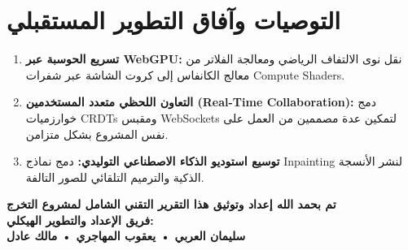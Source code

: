 \documentclass[12pt,a4paper]{report}
\begin{document}
\section{التوصيات وآفاق التطوير المستقبلي}
\begin{enumerate}
    \item \textbf{تسريع الحوسبة عبر WebGPU:} نقل نوى الالتفاف الرياضي ومعالجة الفلاتر من معالج الكانفاس إلى كروت الشاشة عبر شفرات Compute Shaders.
    \item \textbf{التعاون اللحظي متعدد المستخدمين (Real-Time Collaboration):} دمج خوارزميات CRDTs ومقبس WebSockets لتمكين عدة مصممين من العمل على نفس المشروع بشكل متزامن.
    \item \textbf{توسيع استوديو الذكاء الاصطناعي التوليدي:} دمج نماذج Inpainting لنشر الأنسجة الذكية والترميم التلقائي للصور التالفة.
\end{enumerate}

\vspace{1.5cm}
\begin{center}
    \begin{tcolorbox}[colback=StudioLight,colframe=StudioPrimary,arc=3mm,width=0.9\textwidth,center]
        \centering \bfseries \large
        تم بحمد الله إعداد وتوثيق هذا التقرير التقني الشامل لمشروع التخرج\\[0.3cm]
        \textcolor{StudioPrimary}{فريق الإعداد والتطوير الهيكلي:}\\[0.2cm]
        سليمان العربي \quad • \quad يعقوب المهاجري \quad • \quad مالك عادل
    \end{tcolorbox}
\end{center}
\end{document}
